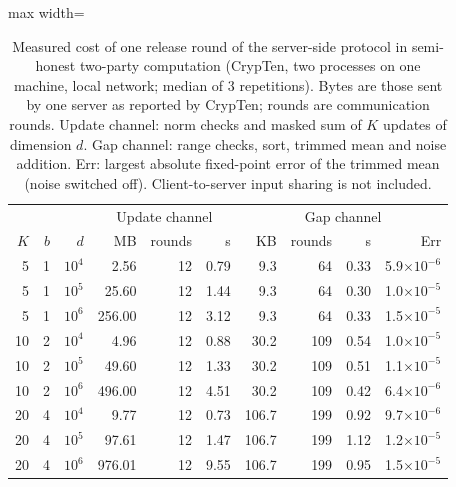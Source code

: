 \begin{table}[tbp]
\centering
\footnotesize
\setlength{\tabcolsep}{4pt}
\caption{Measured cost of one release round of the server-side protocol in semi-honest two-party computation (CrypTen, two processes on one machine, local network; median of 3 repetitions). Bytes are those sent by one server as reported by CrypTen; rounds are communication rounds. Update channel: norm checks and masked sum of $K$ updates of dimension $d$. Gap channel: range checks, sort, trimmed mean and noise addition. Err: largest absolute fixed-point error of the trimmed mean (noise switched off). Client-to-server input sharing is not included.}
\label{tab:mpc}
\begin{adjustbox}{max width=\textwidth}
\begin{tabular}{rrr rrr rrrr}
\toprule
 & & & \multicolumn{3}{c}{Update channel} & \multicolumn{4}{c}{Gap channel} \\
$K$ & $b$ & $d$ & MB & rounds & s & KB & rounds & s & Err \\
\midrule
5 & 1 & $10^{4}$ & 2.56 & 12 & 0.79 & 9.3 & 64 & 0.33 & 5.9$\times10^{-6}$ \\
5 & 1 & $10^{5}$ & 25.60 & 12 & 1.44 & 9.3 & 64 & 0.30 & 1.0$\times10^{-5}$ \\
5 & 1 & $10^{6}$ & 256.00 & 12 & 3.12 & 9.3 & 64 & 0.33 & 1.5$\times10^{-5}$ \\
10 & 2 & $10^{4}$ & 4.96 & 12 & 0.88 & 30.2 & 109 & 0.54 & 1.0$\times10^{-5}$ \\
10 & 2 & $10^{5}$ & 49.60 & 12 & 1.33 & 30.2 & 109 & 0.51 & 1.1$\times10^{-5}$ \\
10 & 2 & $10^{6}$ & 496.00 & 12 & 4.51 & 30.2 & 109 & 0.42 & 6.4$\times10^{-6}$ \\
20 & 4 & $10^{4}$ & 9.77 & 12 & 0.73 & 106.7 & 199 & 0.92 & 9.7$\times10^{-6}$ \\
20 & 4 & $10^{5}$ & 97.61 & 12 & 1.47 & 106.7 & 199 & 1.12 & 1.2$\times10^{-5}$ \\
20 & 4 & $10^{6}$ & 976.01 & 12 & 9.55 & 106.7 & 199 & 0.95 & 1.5$\times10^{-5}$ \\
\bottomrule
\end{tabular}
\end{adjustbox}
\end{table}
